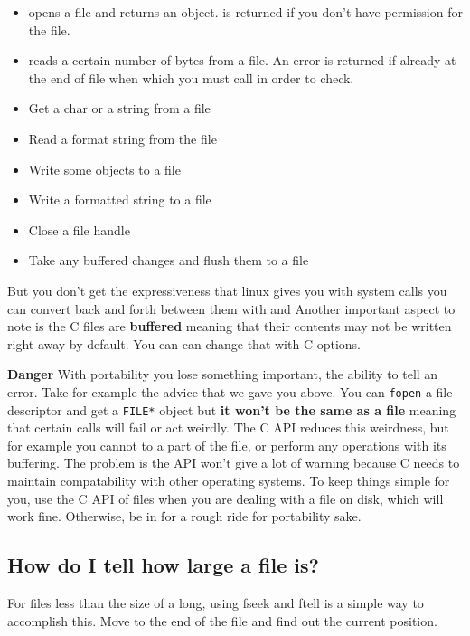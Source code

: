 \begin{itemize}
\item {} opens a file and returns an object.  is returned if you don't have permission for the file.
\item {} reads a certain number of bytes from a file. An error is returned if already at the end of file when which you must call  in order to check.
\item {} Get a char or a string from a file
\item {} Read a format string from the file
\item {} Write some objects to a file
\item {} Write a formatted string to a file
\item {} Close a file handle
\item {} Take any buffered changes and flush them to a file
\end{itemize}

But you don't get the expressiveness that linux gives you with system calls you can convert back and forth between them with  and  Another important aspect to note is the C files are \textbf{buffered} meaning that their contents may not be written right away by default. You can can change that with C options.

\textbf{Danger} With portability you lose something important, the ability to tell an error. Take for example the advice that we gave you above. You can \texttt{fopen} a file descriptor and get a \texttt{FILE*} object but \textbf{it won't be the same as a file} meaning that certain calls will fail or act weirdly. The C API reduces this weirdness, but for example you cannot  to a part of the file, or perform any operations with its buffering. The problem is the API won't give a lot of warning because C needs to maintain compatability with other operating systems. To keep things simple for you, use the C API of files when you are dealing with a file on disk, which will work fine. Otherwise, be in for a rough ride for portability sake.

\subsection{How do I tell how large a file is?}

For files less than the size of a long, using fseek and ftell is a
simple way to accomplish this. Move to the end of the file and find out the current position.

